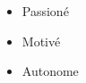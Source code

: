 
\twocolumnsection
{
\begin{skills}
\end{skills}}
{
\vspace{1em}
\begin{itemize}
	\item Passioné
	\item Motivé                    
    \item Autonome
\end{itemize}
}
